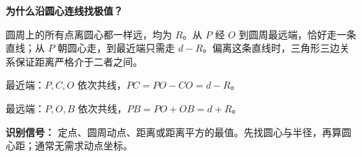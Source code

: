 \begin{explanationbox}
	\textbf{为什么沿圆心连线找极值？}

	圆周上的所有点离圆心都一样远，均为 $R$。从 $P$ 经 $O$ 到圆周最远端，恰好走一条直线；从 $P$ 朝圆心走，到最近端只需走 $d-R$。偏离这条直线时，三角形三边关系保证距离严格介于二者之间。

	最近端：$P,C,O$ 依次共线，$PC=PO-CO=d-R$。\begin{center}
		
	\end{center}
	最远端：$P,O,B$ 依次共线，$PB=PO+OB=d+R$。\begin{center}
		
	\end{center}
	\textbf{识别信号：} 定点、圆周动点、距离或距离平方的最值。先找圆心与半径，再算圆心距；通常无需求动点坐标。
\end{explanationbox}
